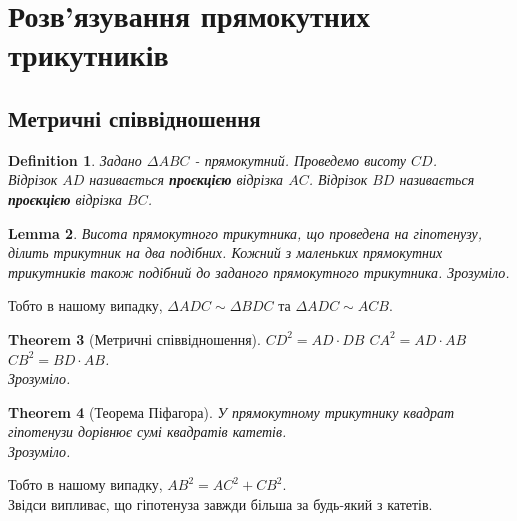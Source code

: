 \documentclass[a4paper, 10pt]{article}
\theoremstyle{theoremdd}
\newtheorem{theorem}{Theorem}[subsection]
\theoremstyle{theoremdd}
\theoremstyle{theoremdd}
\newtheorem{definition}[theorem]{Definition}
\theoremstyle{theoremdd}
\theoremstyle{theoremdd}
\theoremstyle{theoremdd}
\theoremstyle{theoremdd}
\theoremstyle{theoremdd}
\newtheorem{lemma}[theorem]{Lemma}
\theoremstyle{theoremdd}
\begin{document}
\newpage

\section{Розв'язування прямокутних трикутників}
\subsection{Метричні співвідношення}
\begin{definition}
Задано $\Delta ABC$ - прямокутний. Проведемо висоту $CD$.\\
Відрізок $AD$ називається \textbf{проєкцією} відрізка $AC$. Відрізок $BD$ називається \textbf{проєкцією} відрізка $BC$.
\begin{figure}[H]
\centering
{}
\end{figure}
\end{definition}

\begin{lemma}
Висота прямокутного трикутника, що проведена на гіпотенузу, ділить трикутник на два подібних. Кожний з маленьких прямокутних трикутників також подібний до заданого прямокутного трикутника.
\textit{Зрозуміло.}
\end{lemma}
Тобто в нашому випадку, $\Delta ADC \sim \Delta BDC$ та $\Delta ADC \sim ACB$.

\begin{theorem}[Метричні співвідношення]
$CD^2 = AD \cdot DB$ \hspace{1cm} $CA^2 = AD \cdot AB$ \hspace{1cm} $CB^2 = BD \cdot AB$.\\
\textit{Зрозуміло.}
\end{theorem}

\begin{theorem}[Теорема Піфагора]
У прямокутному трикутнику квадрат гіпотенузи дорівнює сумі квадратів катетів.\\
\textit{Зрозуміло.}
\end{theorem}
Тобто в нашому випадку, $AB^2 = AC^2 + CB^2$.\\
Звідси випливає, що гіпотенуза завжди більша за будь-який з катетів.
\end{document}
